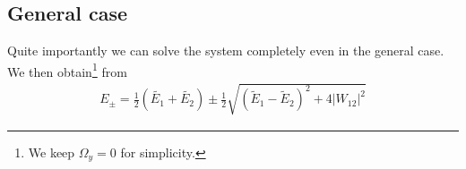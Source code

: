 \subsection{General case}

Quite importantly we can solve the system completely even in the general case. We then obtain\footnote{We keep $\Omega_y =0$ for simplicity.} from 
\begin{align}\label{eq:Epm}
 E_\pm = \frac{1}{2}\left(\tilde{E_1}+\tilde{E_2}\right) \pm \frac{1}{2} \sqrt{\left(\tilde{E}_1-\tilde{E}_2\right)^2+4 \left|W_{12}\right|^2}
\end{align}